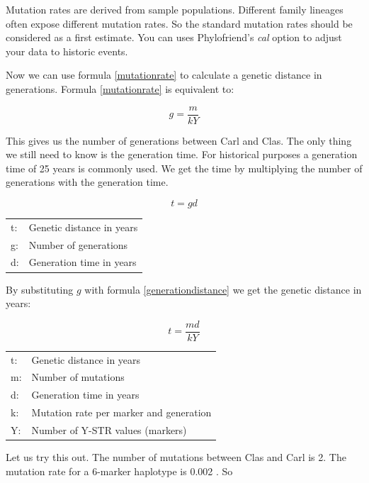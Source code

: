 Mutation rates are derived from sample populations. Different
family lineages often expose different mutation rates. So the
standard mutation rates should be considered as a first 
estimate. You can uses Phylofriend's \emph{cal} option to
adjust your data to historic events.

Now we can use formula \ref{mutationrate} to calculate a
genetic distance in generations. Formula \ref{mutationrate}
is equivalent to:

\begin{equation}
g = \frac{m}{k Y} \label{generationdistance}
\end{equation}

This gives us the number of generations between Carl and Clas.
The only thing we still need to know is the generation time.
For historical purposes a generation time of 25 years is
commonly used. We get the time by multiplying the number
of generations with the generation time.

\begin{equation}
t = g d 
\end{equation}

\begin{tabular}{ll}
t: &  Genetic distance in years\\
g: &  Number of generations \\
d: &  Generation time in years
\end{tabular}
\vspace{1em}

By substituting $g$ with formula \ref{generationdistance}
we get the genetic distance in years:

\begin{equation}
t = \frac{m d}{k Y}
\end{equation}

\begin{tabular}{ll}
t: &  Genetic distance in years\\
m: &  Number of mutations \\
d: &  Generation time in years\\
k: &  Mutation rate per marker and generation\\
Y: &  Number of Y-STR values (markers)
\end{tabular}
\vspace{1em}

Let us try this out. The number of mutations between Clas
and Carl is 2. The mutation rate for a 6-marker haplotype
is 0.002 \cite{Kly09}. So

